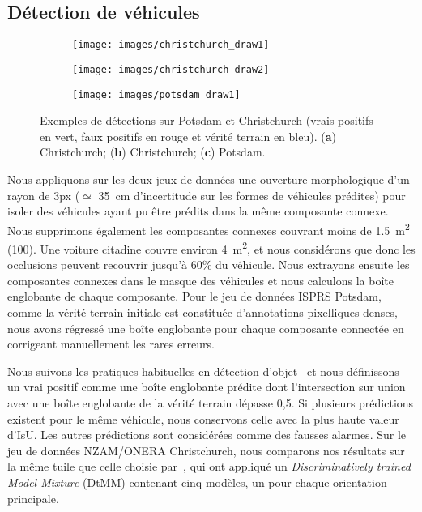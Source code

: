 \subsection{Détection de véhicules}
\begin{figure}[t]
\centering
	\begin{subfigure}{0.3\textwidth}
    	\texttt{[image: images/christchurch\_draw1]}
    	\caption{}
    \end{subfigure}
    \begin{subfigure}{0.3\textwidth}
    	\texttt{[image: images/christchurch\_draw2]}
    	\caption{}
    \end{subfigure}\begin{subfigure}{0.3\textwidth}
    	\texttt{[image: images/potsdam\_draw1]}
    	\caption{}
    \end{subfigure}\vspace{-12pt}
	\caption{Exemples de détections sur Potsdam et Christchurch (vrais positifs en vert, faux positifs en rouge et vérité terrain en bleu). (\textbf{a}) Christchurch; (\textbf{b}) Christchurch; (\textbf{c}) Potsdam.}
    \label{fig:detection_samples}
\end{figure}

Nous appliquons sur les deux jeux de données une ouverture morphologique d'un rayon de 3px ($\simeq$ \SI{35}{\centi\meter} d'incertitude sur les formes de véhicules prédites) pour isoler des véhicules ayant pu être prédits dans la même composante connexe. Nous supprimons également les composantes connexes couvrant moins de \SI{1,5}{\meter\squared} (\SI{100}{\px}). Une voiture citadine couvre environ \SI{4}{\meter\squared}, et nous considérons que donc les occlusions peuvent recouvrir jusqu'à 60\% du véhicule. Nous extrayons ensuite les composantes connexes dans le masque des véhicules et nous calculons la boîte englobante de chaque composante. Pour le jeu de données \gls{ISPRS} Potsdam, comme la vérité terrain initiale est constituée d'annotations pixelliques denses, nous avons régressé une boîte englobante pour chaque composante connectée en corrigeant manuellement les rares erreurs.

Nous suivons les pratiques habituelles en détection d'objet~\cite{everingham_pascal_2014} et nous définissons un vrai positif comme une boîte englobante prédite dont l'intersection sur union avec une boîte englobante de la vérité terrain dépasse 0,5. Si plusieurs prédictions existent pour le même véhicule, nous conservons celle avec la plus haute valeur d'\gls{IsU}. Les autres prédictions sont considérées comme des fausses alarmes. Sur le jeu de données NZAM/ONERA Christchurch, nous comparons nos résultats sur la même tuile que celle choisie par~\citet{randrianarivo_contextual_2016}, qui ont appliqué un \emph{Discriminatively trained Model Mixture} (DtMM) contenant cinq modèles, un pour chaque orientation principale.

